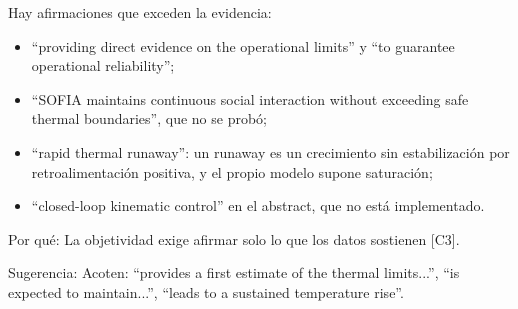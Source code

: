 \documentclass{LabDSTresponse}
\begin{document}
{Hay afirmaciones que exceden la evidencia:
\begin{itemize}
    \item “providing direct evidence on the operational limits” y “to guarantee operational reliability”;
    \item “SOFIA maintains continuous social interaction without exceeding safe thermal boundaries”, que no se probó;
    \item “rapid thermal runaway”: un runaway es un crecimiento sin estabilización por retroalimentación positiva, y el propio modelo supone saturación;
    \item “closed-loop kinematic control” en el abstract, que no está implementado.
\end{itemize}

Por qué: La objetividad exige afirmar solo lo que los datos sostienen [C3].

Sugerencia: Acoten: “provides a first estimate of the thermal limits...”, “is expected to maintain...”, “leads to a sustained temperature rise”.}
\end{document}

